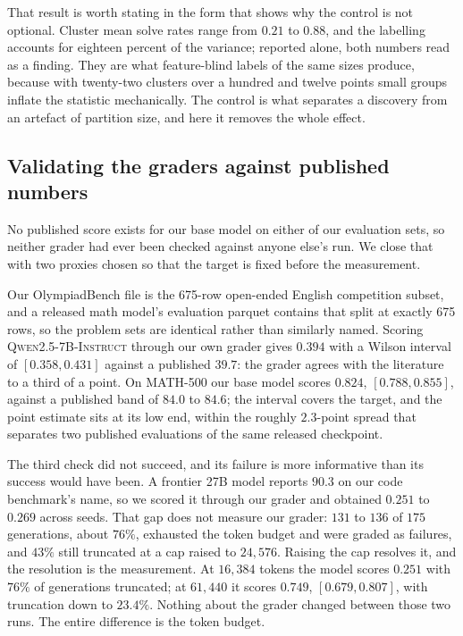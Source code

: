 That result is worth stating in the form that shows why the control is not optional. Cluster mean
solve rates range from $0.21$ to $0.88$, and the labelling accounts for eighteen percent of the
variance; reported alone, both numbers read as a finding. They are what feature-blind labels of the
same sizes produce, because with twenty-two clusters over a hundred and twelve points small groups
inflate the statistic mechanically. The control is what separates a discovery from an artefact of
partition size, and here it removes the whole effect.

\subsection{Validating the graders against published numbers}
\label{sec:harnessvalid}

No published score exists for our base model on either of our evaluation sets, so neither
grader had ever been checked against anyone else's run. We close that with two proxies chosen
so that the target is fixed before the measurement.

Our OlympiadBench file is the 675-row open-ended English competition subset, and a released
math model's evaluation parquet contains that split at exactly 675 rows, so the problem sets
are identical rather than similarly named. Scoring \textsc{Qwen2.5-7B-Instruct} through our own
grader gives $0.394$ with a Wilson interval of $[0.358, 0.431]$ against a published $39.7$: the
grader agrees with the literature to a third of a point. On MATH-500 our base model scores
$0.824$, $[0.788, 0.855]$, against a published band of $84.0$ to $84.6$; the interval covers
the target, and the point estimate sits at its low end, within the roughly $2.3$-point spread
that separates two published evaluations of the same released checkpoint.

The third check did not succeed, and its failure is more informative than its success would
have been. A frontier 27B model reports $90.3$ on our code benchmark's name, so we scored it
through our grader and obtained $0.251$ to $0.269$ across seeds. That gap does not measure our
grader: $131$ to $136$ of $175$ generations, about $76\%$, exhausted the token budget and were
graded as failures, and $43\%$ still truncated at a cap raised to $24{,}576$. Raising the cap resolves it, and the
resolution is the measurement. At $16{,}384$ tokens the model scores $0.251$ with $76\%$ of
generations truncated; at $61{,}440$ it scores $0.749$, $[0.679, 0.807]$, with truncation down to
$23.4\%$. Nothing about the grader changed between those two runs. The entire difference is the
token budget.

